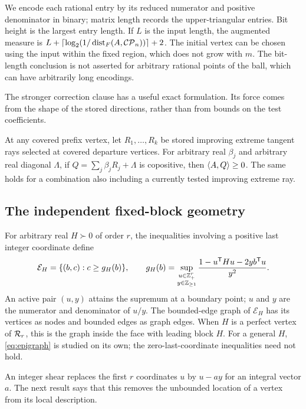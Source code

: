 We encode each rational entry by its reduced numerator and positive denominator in binary; matrix length records the upper-triangular entries. Bit height is the largest entry length. If $L$ is the input length, the augmented measure is $L+\lceil\log_2(1/\operatorname{dist}_F(A,\mathcal{CP}_n))\rceil+2$. The initial vertex can be chosen using the input within the fixed region, which does not grow with $m$. The bit-length conclusion is not asserted for arbitrary rational points of the ball, which can have arbitrarily long encodings.

The stronger correction clause has a useful exact formulation. Its force comes from the shape of the stored directions, rather than from bounds on the test coefficients.

\begin{corollary}\label{cor:stored}
At any covered prefix vertex, let $R_1,\ldots,R_k$ be stored improving extreme tangent rays selected at covered departure vertices. For arbitrary real $\beta_j$ and arbitrary real diagonal $\Lambda$, if $Q=\sum_j\beta_jR_j+\Lambda$ is copositive, then $\langle A,Q\rangle\ge0$. The same holds for a combination also including a currently tested improving extreme ray.
\end{corollary}

\subsection{The independent fixed-block geometry}
For arbitrary real $H\succ0$ of order $r$, the inequalities involving a positive last integer coordinate define
\begin{equation}\label{eq:epigraph}
 \mathcal E_H=\{(b,c):c\ge g_H(b)\},\qquad
 g_H(b)=\sup_{\substack{u\in\mathbb Z_+^r\\y\in\mathbb Z_{\ge1}}}
 \frac{1-u^{\mathsf T} Hu-2yb^{\mathsf T} u}{y^2}.
\end{equation}
An active pair $(u,y)$ attains the supremum at a boundary point; $u$ and $y$ are the numerator and denominator of $u/y$. The bounded-edge graph of $\mathcal E_H$ has its vertices as nodes and bounded edges as graph edges. When $H$ is a perfect vertex of $\mathcal R_r$, this is the graph inside the face with leading block $H$. For a general $H$, \eqref{eq:epigraph} is studied on its own; the zero-last-coordinate inequalities need not hold.

An integer shear replaces the first $r$ coordinates $u$ by $u-ay$ for an integral vector $a$. The next result says that this removes the unbounded location of a vertex from its local description.

